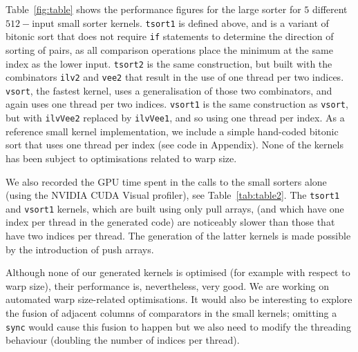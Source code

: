 Table~\ref{fig:table} shows the performance figures for the large sorter
for $5$ different $512-$input small sorter kernels.
{\tt tsort1} is defined above, and is a variant of bitonic sort
that does not require {\tt if} statements to determine the direction
of sorting of pairs, as all comparison operations place the minimum at the
same index as the lower input.
{\tt tsort2} is the same construction, but built with the combinators {\tt ilv2}
and {\tt vee2} that result in the use of one thread per two indices.
{\tt vsort}, the fastest kernel, uses a generalisation of those
two combinators, and again uses one thread per two indices.
{\tt vsort1} is the same construction as {\tt vsort}, but with {\tt ilvVee2} replaced
by {\tt ilvVee1}, and so using one thread per index.
As a reference small kernel implementation, we include a simple hand-coded bitonic sort
that uses one thread per index (see code in Appendix).
None of the kernels has been subject to optimisations related to warp size.



We also recorded the GPU time spent in the calls to the small sorters alone (using the NVIDIA CUDA Visual profiler), see Table~\ref{tab:table2}.
The {\tt tsort1} and {\tt vsort1} kernels, which are built using only pull arrays, 
(and which have one index per thread in the generated code) are
noticeably slower than those that have two indices per thread.
The generation of the latter kernels is made possible by the introduction of 
push arrays.



Although none of our generated kernels is optimised (for example with respect to warp size), 
their performance is, nevertheless, very good. We are working on automated warp size-related 
optimisations. It would also be interesting to explore the fusion of adjacent columns of 
comparators in the small kernels; omitting a {\tt sync} would cause this fusion to happen
but we also need to modify the threading behaviour (doubling the number of indices per thread).


